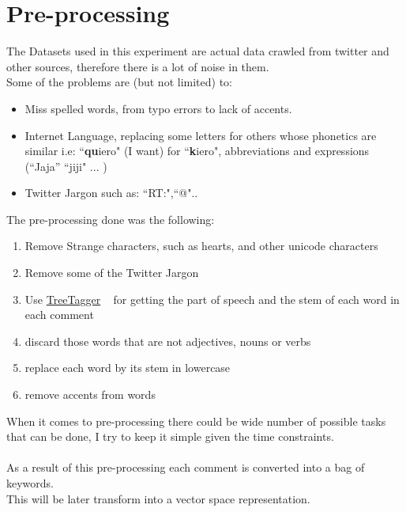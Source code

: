 \documentclass[4pt,a4paper,twocolumn]{article}
\begin{document}
\section{Pre-processing}

The Datasets used in this experiment are actual data crawled from twitter and other sources, therefore there is a lot of noise in them.\\
Some of the problems are (but not limited) to:\\
\begin{itemize}
	\item Miss spelled words, from typo errors to lack of accents.
	\item Internet Language, replacing some letters for others whose phonetics are similar i.e: ``\textbf{qu}iero" (I want) for ``\textbf{k}iero", abbreviations and expressions (``Jaja'' ``jiji" ... )
	\item Twitter Jargon such as: ``RT:",``@"..
\end{itemize} 

The pre-processing done was the following:
\begin{enumerate}
	\item Remove Strange characters, such as hearts, and other unicode characters
	\item Remove some of the Twitter Jargon 
	\item Use \href{http://www.ims.uni-stuttgart.de/projekte/corplex/TreeTagger/}{TreeTagger} ~\cite{Schmid94probabilisticpart-of-speech} for getting the part of speech and the stem of each word in each comment
	\item discard those words that are not adjectives, nouns or verbs
	\item replace each word by its stem in lowercase
	\item remove accents from words
\end{enumerate}

When it comes to pre-processing there could be wide number of possible 
tasks that can be done, I try to keep it simple given the time constraints. \\
\\
As a result of this pre-processing each comment is converted into a bag of keywords.\\
This will be later transform into a vector space representation.


\end{document}
